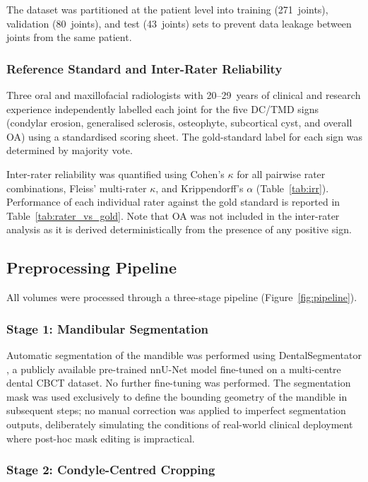 \documentclass[review,12pt]{elsarticle}
\begin{document}
The dataset was partitioned at the patient level into training
(271~joints), validation (80~joints), and test (43~joints) sets to
prevent data leakage between joints from the same patient.

\subsubsection{Reference Standard and Inter-Rater Reliability}

Three oral and maxillofacial radiologists with 20--29~years of clinical
and research experience independently labelled each joint for the five
DC/TMD signs (condylar erosion, generalised sclerosis, osteophyte,
subcortical cyst, and overall OA) using a standardised scoring sheet. The gold-standard label for each sign was determined by majority vote.

Inter-rater reliability was quantified using Cohen's $\kappa$ for all
pairwise rater combinations, Fleiss' multi-rater $\kappa$, and
Krippendorff's $\alpha$ (Table~\ref{tab:irr}). Performance of each
individual rater against the gold standard is reported in
Table~\ref{tab:rater_vs_gold}. Note that OA was not included in the
inter-rater analysis as it is derived deterministically from the
presence of any positive sign.

\subsection{Preprocessing Pipeline}
\label{sec:preproc}

All volumes were processed through a three-stage pipeline
(Figure~\ref{fig:pipeline}).

\subsubsection{Stage 1: Mandibular Segmentation}

Automatic segmentation of the mandible was performed using
DentalSegmentator \cite{dot2024dentalsegmentator}, a publicly available
pre-trained nnU-Net \cite{isensee2021nnu} model fine-tuned on a multi-centre
dental CBCT dataset. No further fine-tuning was performed. The segmentation
mask was used exclusively to define the bounding geometry of the mandible
in subsequent steps; no manual correction was applied to imperfect segmentation outputs, deliberately simulating the conditions of real-world clinical deployment where post-hoc mask editing is impractical.

\subsubsection{Stage 2: Condyle-Centred Cropping}
\end{document}

